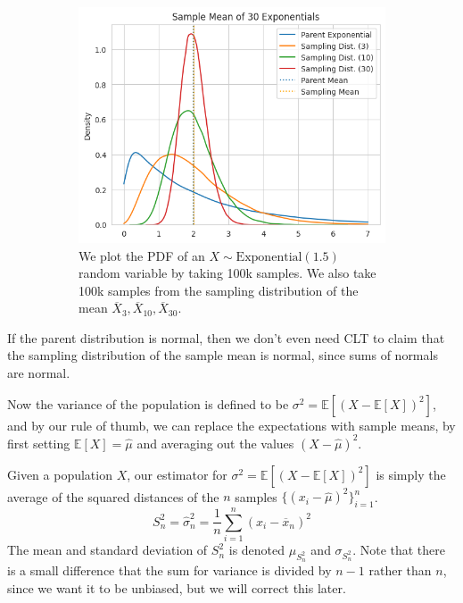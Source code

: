 \begin{example}
\begin{figure}[H]
\begin{subfigure}[b]{0.48\textwidth}
        \includegraphics[width=\textwidth]{img/sample_mean_exp.png}
        \caption{We plot the PDF of an $X \sim \mathrm{Exponential}(1.5)$ random variable by taking 100k samples. We also take 100k samples from the sampling distribution of the mean $\overline{X}_{3}, \overline{X}_{10}, \overline{X}_{30}$. }
        \label{fig:sample_mean_exp}
      \end{subfigure}
      \caption{}
      \label{fig:sample_mean_examples}
    \end{figure}
  \end{example}

  If the parent distribution is normal, then we don't even need CLT to claim that the sampling distribution of the sample mean is normal, since sums of normals are normal. 

  Now the variance of the population is defined to be $\sigma^2 = \mathbb{E}[ (X - \mathbb{E}[X])^2 ]$, and by our rule of thumb, we can replace the expectations with sample means, by first setting $\mathbb{E}[X] = \widehat{\mu}$ and averaging out the values $(X - \widehat{\mu})^2$. 

  \begin{definition}
    Given a population $X$, our estimator for $\sigma^2 = \mathbb{E}[ (X - \mathbb{E}[X])^2 ]$ is simply the average of the squared distances of the $n$ samples $\{(x_i - \widehat{\mu})^2\}_{i=1}^n$. 
    \begin{equation}
      S^2_n = \widehat{\sigma}^2_n = \frac{1}{n} \sum_{i=1}^n ( x_i - \overline{x}_n)^2
    \end{equation}
    The mean and standard deviation of $S^2_n$ is denoted $\mu_{S^2_n}$ and $\sigma_{S^2_n}$. Note that there is a small difference that the sum for variance is divided by $n-1$ rather than $n$, since we want it to be unbiased, but we will correct this later. 
  \end{definition}

